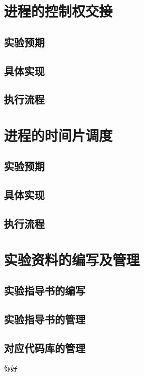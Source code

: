 \section{进程的控制权交接}

\subsection{实验预期}

\subsection{具体实现}

\subsection{执行流程}

\section{进程的时间片调度}

\subsection{实验预期}

\subsection{具体实现}

\subsection{执行流程}

\section{实验资料的编写及管理}

\subsection{实验指导书的编写}

\subsection{实验指导书的管理}

\subsection{对应代码库的管理}
你好
